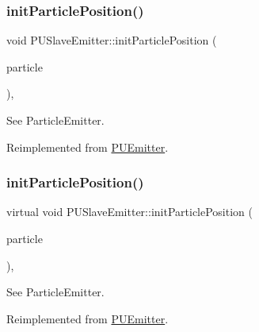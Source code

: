 \subsubsection{\texorpdfstring{init\+Particle\+Position()}{initParticlePosition()}\hspace{0.1cm}{\footnotesize\ttfamily [1/2]}}
{\footnotesize\ttfamily void P\+U\+Slave\+Emitter\+::init\+Particle\+Position (\begin{DoxyParamCaption}\item[{\hyperlink{structPUParticle3D}{P\+U\+Particle3D} $\ast$}]{particle }\end{DoxyParamCaption})\hspace{0.3cm}{\ttfamily [override]}, {\ttfamily [virtual]}}

See Particle\+Emitter. 

Reimplemented from \hyperlink{classPUEmitter_a2449f31b73c94a55f6559be71d56ca61}{P\+U\+Emitter}.

\mbox{\label{classPUSlaveEmitter_a8498d171d9db253b48e103c9946abba3}} 
\subsubsection{\texorpdfstring{init\+Particle\+Position()}{initParticlePosition()}\hspace{0.1cm}{\footnotesize\ttfamily [2/2]}}
{\footnotesize\ttfamily virtual void P\+U\+Slave\+Emitter\+::init\+Particle\+Position (\begin{DoxyParamCaption}\item[{\hyperlink{structPUParticle3D}{P\+U\+Particle3D} $\ast$}]{particle }\end{DoxyParamCaption})\hspace{0.3cm}{\ttfamily [override]}, {\ttfamily [virtual]}}

See Particle\+Emitter. 

Reimplemented from \hyperlink{classPUEmitter_a2449f31b73c94a55f6559be71d56ca61}{P\+U\+Emitter}.

\mbox{\label{classPUSlaveEmitter_a9f518377b3215049adc9708686f62217}} 
